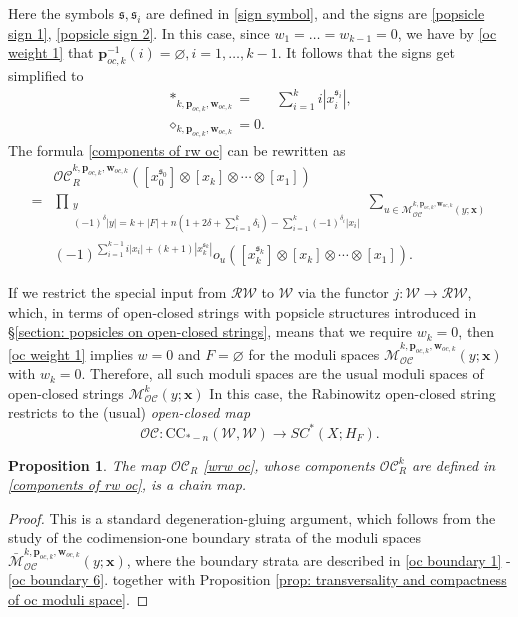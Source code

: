 \documentclass[11pt]{amsproc}
\def\w{\mathcal{W}(E)}
\def\oc{\mathcal{OC}}
\def\r#1{\mathrm{#1}}
\def\w{\mathcal{W}}
\def\rw{\mathcal{RW}}
\def\d{\delta}
\def\M{\mathcal{M}}
\def\sk{\mathfrak{s}}
\newtheorem{prop}[lem]{Proposition}
\theoremstyle{remark}
\numberwithin{equation}{section}
\begin{document}
Here the symbols $\sk, \sk_{i}$ are defined in \eqref{sign symbol},
and the signs are \eqref{popsicle sign 1}, \eqref{popsicle sign 2}.
In this case, since $w_{1} = \ldots = w_{k-1} = 0$, 
we have by \eqref{oc weight 1} that $\mathbf{p}_{oc, k}^{-1}(i) = \varnothing, i = 1, \ldots, k-1$.
It follows that the signs get simplified to
\begin{align}
*_{k, \mathbf{p}_{oc, k}, \mathbf{w}_{oc, k}} = & \sum_{i=1}^{k} i|x_{i}^{\sk_{i}}|, \\
\diamond_{k, \mathbf{p}_{oc, k}, \mathbf{w}_{oc, k}} = 0.
\end{align}
The formula \eqref{components of rw oc} can be rewritten as
\begin{equation}
\begin{split}
&\oc_{R}^{k, \mathbf{p}_{oc, k}, \mathbf{w}_{oc, k}}([x_{0}^{\sk_{0}}] \otimes [x_{k}] \otimes \cdots \otimes [x_{1}])\\
= & \prod_{\substack{y\\ (-1)^{\d}|y| = k + |F| + n(1+2\d+\sum_{i=1}^{k}\d_{i}) - \sum_{i=1}^{k} (-1)^{\d_{i}}|x_{i}|}} \sum_{u \in \M_{\oc}^{k, \mathbf{p}_{oc, k}, \mathbf{w}_{oc, k}}(y; \mathbf{x})} \\
&(-1)^{\sum_{i=1}^{k-1} i |x_{i}| + (k+1)|x_{k}^{\sk_{k}}|} o_{u}([x_{k}^{\sk_{k}}] \otimes [x_{k}] \otimes \cdots \otimes [x_{1}]).
\end{split}
\end{equation}

If we restrict the special input from $\rw$ to $\w$ via the functor $j: \w \to \rw$,
which, in terms of open-closed strings with popsicle structures introduced in \S\ref{section: popsicles on open-closed strings}, means that we require $w_{k}=0$,
then \eqref{oc weight 1} implies $w = 0$ and $F = \varnothing$ for the moduli spaces $\M_{\oc}^{k, \mathbf{p}_{oc, k}, \mathbf{w}_{oc, k}}(y; \mathbf{x})$ with $w_{k}=0$.
Therefore, all such moduli spaces are the usual moduli spaces of open-closed strings $\M_{\oc}^{k}(y; \mathbf{x})$
In this case, the Rabinowitz open-closed string restricts to the (usual) {\it open-closed map}
\begin{equation}\label{usual oc}
\oc: \r{CC}_{*-n}(\w, \w) \to SC^{*}(X; H_{F}).
\end{equation}

\begin{prop}\label{lem: wrw oc chain map}
The map $\oc_{R}$ \eqref{wrw oc}, whose components $\oc_{R}^{k}$ are defined in \eqref{components of rw oc}, is a chain map.
\end{prop} 
\begin{proof}
This is a standard degeneration-gluing argument,
which follows from the study of the codimension-one boundary strata of the moduli spaces $\bar{\M}_{\oc}^{k, \mathbf{p}_{oc, k}, \mathbf{w}_{oc, k}}(y; \mathbf{x})$,
where the boundary strata are described in \eqref{oc boundary 1} - \eqref{oc boundary 6}.
together with Proposition \ref{prop: transversality and compactness of oc moduli space}.
\end{proof}
\end{document}
